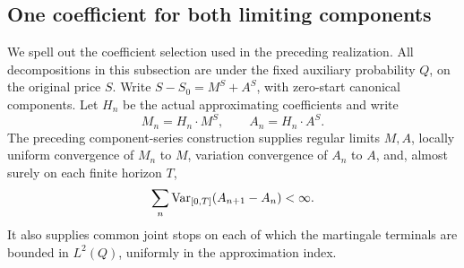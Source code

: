 \subsection{One coefficient for both limiting components}
\label{sec:joint-coefficient}
We spell out the coefficient selection used in the preceding realization.
All decompositions in this subsection are under the fixed auxiliary
probability $Q$, on the original price $S$.
Write $S-S_0=M^S+A^S$, with zero-start canonical components.
Let $H_n$ be the actual approximating coefficients and write
\[
 M_n=H_n\cdot M^S,\qquad A_n=H_n\cdot A^S.
\]
The preceding component-series construction supplies regular limits $M,A$,
locally uniform convergence of $M_n$ to $M$, variation convergence of $A_n$
to $A$, and, almost surely on each finite horizon $T$,
\[
 \sum_n\operatorname{Var}_{[0,T]}(A_{n+1}-A_n)<\infty.
\]
It also supplies common joint stops on each of which the martingale
terminals are bounded in $L^2(Q)$, uniformly in the approximation index.


